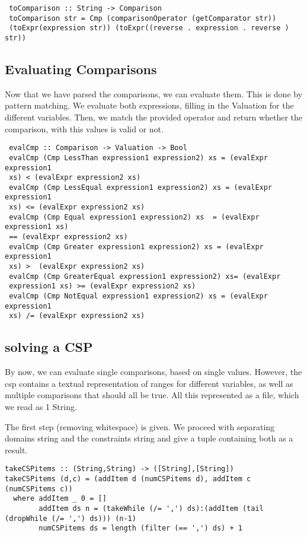 \documentclass[a4paper,11pt]{article}
\begin{document}
 \begin{lstlisting}
 toComparison :: String -> Comparison
 toComparison str = Cmp (comparisonOperator (getComparator str)) 
 (toExpr(expression str)) (toExpr((reverse . expression . reverse ) str))
 \end{lstlisting}
 
 \subsection{Evaluating Comparisons}
 
 Now that we have parsed the comparisons, we can evaluate them. This is done 
 by pattern matching. We evaluate both expressions, filling in the Valuation 
 for the different variables. Then, we match the provided operator and 
 return whether the comparison, with this values is valid or not.
 \begin{lstlisting}
 evalCmp :: Comparison -> Valuation -> Bool
 evalCmp (Cmp LessThan expression1 expression2) xs = (evalExpr expression1 
 xs) < (evalExpr expression2 xs)
 evalCmp (Cmp LessEqual expression1 expression2) xs = (evalExpr expression1 
 xs) <= (evalExpr expression2 xs)
 evalCmp (Cmp Equal expression1 expression2) xs  = (evalExpr expression1 xs) 
 == (evalExpr expression2 xs)
 evalCmp (Cmp Greater expression1 expression2) xs = (evalExpr expression1 
 xs) >  (evalExpr expression2 xs)
 evalCmp (Cmp GreaterEqual expression1 expression2) xs= (evalExpr 
 expression1 xs) >= (evalExpr expression2 xs)
 evalCmp (Cmp NotEqual expression1 expression2) xs = (evalExpr expression1 
 xs) /= (evalExpr expression2 xs)
 \end{lstlisting}
 \subsection{solving a CSP}
 
 By now, we can evaluate single comparisons, based on single values. 
 However, the csp contains a textual representation of ranges for different 
 variables, as well as multiple comparisons that should all be true. All this 
 represented as a file, which we read as 1 String.
 
 The first step (removing whitespace) is given. We proceed with separating 
 domains string and the constraints  string and give a tuple containing  both 
 as a result.
 
\begin{lstlisting}
takeCSPitems :: (String,String) -> ([String],[String])
takeCSPitems (d,c) = (addItem d (numCSPitems d), addItem c (numCSPitems c))
  where addItem _ 0 = []
        addItem ds n = (takeWhile (/= ',') ds):(addItem (tail (dropWhile (/= ',') ds))) (n-1)
        numCSPitems ds = length (filter (== ',') ds) + 1
\end{lstlisting}
 
\end{document}
